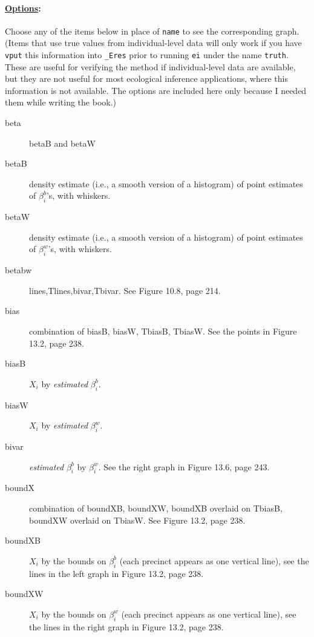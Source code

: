 \documentclass[11pt,titlepage]{article}
\begin{document}
\paragraph{\underline{Options}:}
Choose any of the items below in place of \texttt{name} to see the
corresponding graph.  (Items that use true values from
individual-level data will only work if you have \texttt{vput} this
information into \texttt{\_Eres} prior to running \texttt{ei} under
the name \texttt{truth}.  These are useful for verifying the method if
individual-level data are available, but they are not useful for most
ecological inference applications, where this information is not
available.  The options are included here only because I needed them
while writing the book.)
\begin{description}
\item[beta] betaB and betaW

\item[betaB] density estimate (i.e., a smooth version of a histogram)
  of point estimates of $\beta^b_i$'s, with whiskers.

\item[betaW] density estimate (i.e., a smooth version of a histogram)
  of point estimates of $\beta^w_i$'s, with whiskers.

\item[betabw] lines,Tlines,bivar,Tbivar.  See Figure 10.8, page 214.

\item[bias] combination of biasB, biasW, TbiasB, TbiasW. See the
  points in Figure 13.2, page 238.

\item[biasB] $X_i$ by \emph{estimated} $\beta_i^b$.

\item[biasW] $X_i$ by \emph{estimated} $\beta_i^w$.

\item[bivar] \emph{estimated} $\beta_i^b$ by $\beta_i^w$.  See the
  right graph in Figure 13.6, page 243.

\item[boundX] combination of boundXB, boundXW, boundXB overlaid on
  TbiasB, boundXW overlaid on TbiasW.  See Figure 13.2, page 238.

\item[boundXB] $X_i$ by the bounds on $\beta_i^b$ (each precinct
  appears as one vertical line), see the lines in the left graph in
  Figure 13.2, page 238.

\item[boundXW] $X_i$ by the bounds on $\beta_i^w$ (each precinct
  appears as one vertical line), see the lines in the right graph in
  Figure 13.2, page 238.


\end{description}
\end{document}
